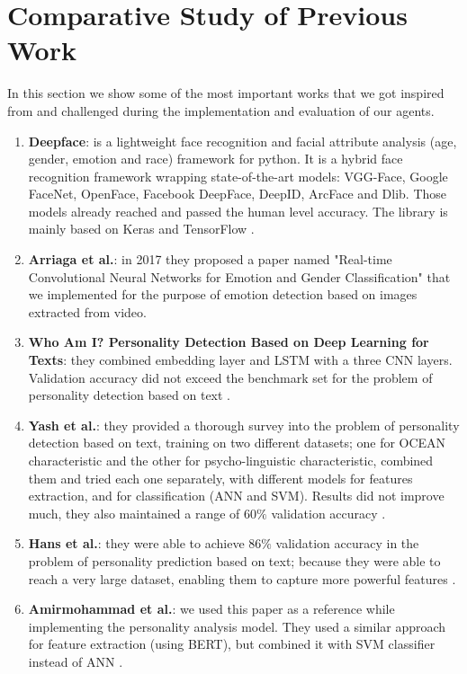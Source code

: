 \section{Comparative Study of Previous Work}
\label{sec:comparitive}
In this section we show some of the most important works that we got inspired from and challenged during the implementation and evaluation of our agents.\\
\begin{enumerate}
    \item \textbf{Deepface}: is a lightweight face recognition and facial attribute analysis (age, gender, emotion and race) framework for python. It is a hybrid face recognition framework wrapping state-of-the-art models: VGG-Face, Google FaceNet, OpenFace, Facebook DeepFace, DeepID, ArcFace and Dlib. Those models already reached and passed the human level accuracy. The library is mainly based on Keras and TensorFlow \cite{deepface}.
    
    \item \textbf{Arriaga et al.}: in 2017 they proposed a paper named "Real-time Convolutional Neural Networks for Emotion and Gender Classification" \cite{ariaga} that we implemented for the purpose of emotion detection based on images extracted from video.
    
    \item \textbf{Who Am I? Personality Detection Based on Deep Learning for Texts}: they combined embedding layer and LSTM with a three CNN layers. Validation accuracy did not exceed the benchmark set for the problem of personality detection based on text \cite{who am i}.
    
    \item \textbf{Yash et al.}: they provided a thorough survey into the problem of personality detection based on text, training on two different datasets; one for OCEAN characteristic and the other for psycho-linguistic characteristic, combined them and tried each one separately, with different models for features extraction, and for classification (ANN and SVM). Results did not improve much, they also maintained a range of $60\%$ validation accuracy \cite{yash}.
    
    \item \textbf{Hans et al.}: they were able to achieve $86\%$ validation accuracy in the problem of personality prediction based on text; because they were able to reach a very large dataset, enabling them to capture more powerful features \cite{hans}.
    
    \item \textbf{Amirmohammad et al.}: we used this paper as a reference while implementing the personality analysis model. They used a similar approach for feature extraction (using BERT), but combined it with SVM classifier instead of ANN \cite{yash_2}.
    
    
\end{enumerate}

